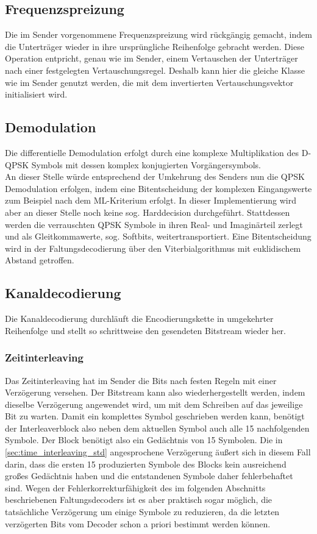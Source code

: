 \subsection{Frequenzspreizung}
Die im Sender vorgenommene Frequenzspreizung wird rückgängig gemacht, indem die Unterträger wieder in ihre ursprüngliche Reihenfolge gebracht werden. Diese Operation entpricht, genau wie im Sender, einem Vertauschen der Unterträger nach einer festgelegten Vertauschungsregel. Deshalb kann hier die gleiche Klasse wie im Sender genutzt werden, die mit dem invertierten Vertauschungsvektor initialisiert wird.

\subsection{Demodulation}
Die differentielle Demodulation erfolgt durch eine komplexe Multiplikation des D-QPSK Symbols mit dessen komplex konjugierten Vorgängersymbols.\\
An dieser Stelle würde entsprechend der Umkehrung des Senders nun die QPSK Demodulation erfolgen, indem eine Bitentscheidung der komplexen Eingangswerte zum Beispiel nach dem \ac{ML}-Kriterium erfolgt. In dieser Implementierung wird aber an dieser Stelle noch keine sog. Harddecision durchgeführt. Stattdessen werden die verrauschten QPSK Symbole in ihren Real- und Imaginärteil zerlegt und als Gleitkommawerte, sog. Softbits, weitertransportiert. Eine Bitentscheidung wird in der Faltungsdecodierung über den Viterbialgorithmus mit euklidischem Abstand getroffen.

\subsection{Kanaldecodierung}
Die Kanaldecodierung durchläuft die Encodierungskette in umgekehrter Reihenfolge und stellt so schrittweise den gesendeten Bitstream wieder her.

\subsubsection{Zeitinterleaving}
Das Zeitinterleaving hat im Sender die Bits nach festen Regeln mit einer Verzögerung versehen. Der Bitstream kann also wiederhergestellt werden, indem dieselbe Verzögerung angewendet wird, um mit dem Schreiben auf das jeweilige Bit zu warten. Damit ein komplettes Symbol geschrieben werden kann, benötigt der Interleaverblock also neben dem aktuellen Symbol auch alle 15 nachfolgenden Symbole. Der Block benötigt also ein Gedächtnis von 15 Symbolen. Die in \ref{sec:time_interleaving_std} angesprochene Verzögerung äußert sich in diesem Fall darin, dass die ersten 15 produzierten Symbole des Blocks kein ausreichend großes Gedächtnis haben und die entstandenen Symbole daher fehlerbehaftet sind. Wegen der Fehlerkorrekturfähigkeit des im folgenden Abschnitts beschriebenen Faltungsdecoders ist es aber praktisch sogar möglich, die tatsächliche Verzögerung um einige Symbole zu reduzieren, da die letzten verzögerten Bits vom Decoder schon a priori bestimmt werden können.

